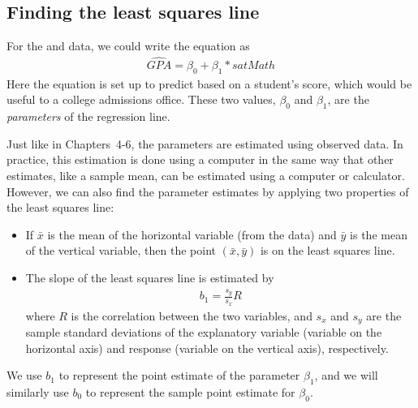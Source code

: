 \subsection{Finding the least squares line}
\label{findingTheLeastSquaresLineSection}

For the  and  data, we could write the equation as
\begin{eqnarray}
\widehat{GPA} = \beta_0 + \beta_1*satMath
\label{LSRLineForSATMathToPredictGPAStillWithParametersUnknown}
\end{eqnarray}
Here the equation is set up to predict  based on a student's  score, which would be useful to a college admissions office. These two values, $\beta_0$ and $\beta_1$, are the \emph{parameters} of the regression line.

Just like in Chapters~4-6, the parameters are estimated using observed data. In practice, this estimation is done using a computer in the same way that other estimates, like a sample mean, can be estimated using a computer or calculator. However, we can also find the parameter estimates by applying two properties of the least squares line: %
\begin{itemize}
\item If $\bar{x}$ is the mean of the horizontal variable (from the data) and $\bar{y}$ is the mean of the vertical variable, then the point $(\bar{x}, \bar{y})$ is on the least squares line.
\item The slope of the least squares line is estimated by
\begin{eqnarray}
b_1 = \frac{s_y}{s_x} R
\label{slopeOfLSRLine}
\end{eqnarray}
where $R$ is the correlation between the two variables, and $s_x$ and $s_y$ are the sample standard deviations of the explanatory variable (variable on the horizontal axis) and response (variable on the vertical axis), respectively.
\end{itemize}
We use $b_1$ to represent the point estimate of the parameter $\beta_1$, and we will similarly use $b_0$ to represent the sample point estimate for $\beta_0$.

